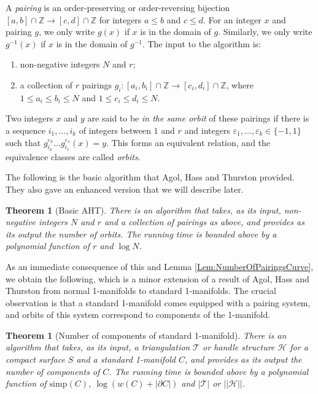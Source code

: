 \documentclass[oneside]{amsart}
\numberwithin{equation}{section}
\theoremstyle{plain}
\newtheorem{theorem}[equation]{Theorem}
\theoremstyle{definition}
\newcommand{\calT}{{\mathcal{T}}}
\newcommand{\calH}{\mathcal{H}}
\begin{document}
A \emph{pairing} is an order-preserving or order-reversing bijection $[a,b] \cap \mathbb{Z} \rightarrow [c,d] \cap \mathbb{Z}$ for integers $a \leq b$ and $c \leq d$. For an integer $x$ and pairing $g$, we only write $g(x)$ if $x$ is in the domain of $g$. Similarly, we only write $g^{-1}(x)$ if $x$ is in the domain of $g^{-1}$.
The input to the algorithm is:
\begin{enumerate}
\item non-negative integers $N$ and $r$;
\item a collection of $r$ pairings $g_i \colon [a_i, b_i] \cap \mathbb{Z} \rightarrow [c_i, d_i] \cap \mathbb{Z}$, where $1 \leq a_i \leq b_i \leq N$ and $1 \leq c_i \leq d_i \leq N$.
\end{enumerate}
Two integers $x$ and $y$ are said to be \emph{in the same orbit} of these pairings if there is a sequence $i_1, \dots, i_k$ of integers between $1$ and $r$ and integers $\varepsilon_1, \dots, \varepsilon_k \in \{-1, 1\}$ such that $g_{i_k}^{\varepsilon_k} \dots g_{i_1}^{\varepsilon_1}(x) = y$. This forms an equivalent relation, and the equivalence classes are called \emph{orbits}.

The following is the basic algorithm that Agol, Hass and Thurston provided. They also gave an enhanced version that we will describe later.

\begin{theorem}[{\sc Basic AHT}]
There is an algorithm that takes, as its input, non-negative integers $N$ and $r$ and a collection of pairings as above, and provides as its output the number of orbits. The running time is bounded above by a polynomial function of $r$ and $\log N$.
\end{theorem}

As an immediate consequence of this and Lemma \ref{Lem:NumberOfPairingsCurve}, we obtain the following, which is a minor extension of a result of Agol, Hass and Thurston \cite[Corollary 13]{AHT} from normal 1-manifolds to standard 1-manifolds. The crucial observation is that a standard 1-manifold comes equipped with a pairing system, and orbits of this system correspond to components of the 1-manifold.

\begin{theorem}[{\sc Number of components of standard 1-manifold}]
\label{Thm:NumberComponentsCurves}
There is an algorithm that takes, as its input, a triangulation $\calT$ or handle structure $\calH$ for a compact surface $S$ and a standard 1-manifold $C$, and provides as its output the number of components of $C$. The running time is bounded above by a polynomial function of $\mathrm{simp}(C)$, $\log (w(C) + |\partial C|)$ and $|\calT|$ or $||\calH||$.
\end{theorem}
\end{document}
